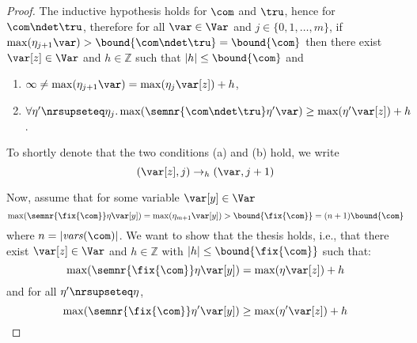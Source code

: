 \begin{proof}
  The inductive hypothesis holds for \(\com\) and \(\tru\), hence for
  \(\com \ndet \tru\), therefore for all \(\var \in \Var\) and
  \(j \in \{0,1, \ldots, m\}\), if \(\max(\eta_{j+1} \var) >\bound{\com\ndet \tru} =\bound{\com}\) then
  there exist \(\var[z] \in \Var\) and \(h \in \mathbb{Z}\) such that \(|h| \leq \bound{\com}\) and 
  \begin{enumerate}[label=(\alph*)]
  \item \(\infty \neq \max(\eta_{j+1} \var) = \max(\eta_j \var[z]) + h\),
  \item \(\forall \eta' \nrsupseteq \eta_j.
    \max(\semnr{\com \ndet \tru}\eta'\var) \geq \max(\eta' \var[z]) + h\).
  \end{enumerate}
  To shortly denote that the two conditions (a) and (b) hold, we write
  \[
  (\var[z],j) \to_{h} (\var, j+1)
  \]
  
  Now, assume that for some variable \(\var[y] \in \Var\)
  \[\max(\semnr{\fix{\com}} \eta \var[y]) = \max(\eta_{m+1} \var[y]) >
  \bound{\fix{\com}} = (n+1) \bound{\com}\]
  where \(n=|\mathit{vars}(\com)|\). 
  We want to show that the thesis holds, i.e., that there exist
  \(\var[z] \in \Var\) and \(h \in \mathbb{Z}\) with
  \(|h| \leq \bound{\fix{\com}}\) such that:
  \begin{equation}\label{eq:maxendmaxstartnr}
    \max(\semnr{\fix{\com}} \eta \var[y]) = \max(\eta \var[z]) + h
  \end{equation}
  and for all \(\eta' \nrsupseteq \eta\),
  \begin{equation}\label{eq:maxmiddlemaxendnr}
    \max(\semnr{\fix{\com}} \eta' \var[y]) \geq \max(\eta' \var[z]) + h
  \end{equation}
  

\end{proof}
